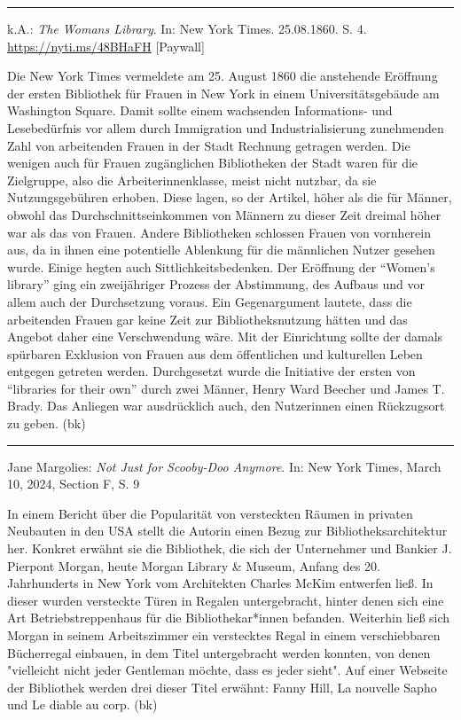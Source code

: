 \documentclass[a4paper,
fontsize=11pt,
oneside,
numbers=noperiodatend,
parskip=half-,
bibliography=totoc,
final
]{scrartcl}
\begin{document}
\begin{center}\rule{0.5\linewidth}{0.5pt}\end{center}

k.A.: \emph{The Woman\textquotesingle s Library}. In: New York Times.
25.08.1860. S. 4. \url{https://nyti.ms/48BHaFH} {[}Paywall{]}

Die New York Times vermeldete am 25. August 1860 die anstehende
Eröffnung der ersten Bibliothek für Frauen in New York in einem
Universitätsgebäude am Washington Square. Damit sollte einem wachsenden
Informations- und Lesebedürfnis vor allem durch Immigration und
Industrialisierung zunehmenden Zahl von arbeitenden Frauen in der Stadt
Rechnung getragen werden. Die wenigen auch für Frauen zugänglichen
Bibliotheken der Stadt waren für die Zielgruppe, also die
Arbeiterinnenklasse, meist nicht nutzbar, da sie Nutzungsgebühren
erhoben. Diese lagen, so der Artikel, höher als die für Männer, obwohl
das Durchschnittseinkommen von Männern zu dieser Zeit dreimal höher war
als das von Frauen. Andere Bibliotheken schlossen Frauen von vornherein
aus, da in ihnen eine potentielle Ablenkung für die männlichen Nutzer
gesehen wurde. Einige hegten auch Sittlichkeitsbedenken. Der Eröffnung
der \enquote{Women's library} ging ein zweijähriger Prozess der
Abstimmung, des Aufbaus und vor allem auch der Durchsetzung voraus. Ein
Gegenargument lautete, dass die arbeitenden Frauen gar keine Zeit zur
Bibliotheksnutzung hätten und das Angebot daher eine Verschwendung wäre.
Mit der Einrichtung sollte der damals spürbaren Exklusion von Frauen aus
dem öffentlichen und kulturellen Leben entgegen getreten werden.
Durchgesetzt wurde die Initiative der ersten von \enquote{libraries for
their own} durch zwei Männer, Henry Ward Beecher und James T. Brady. Das
Anliegen war ausdrücklich auch, den Nutzerinnen einen Rückzugsort zu
geben. (bk)

\begin{center}\rule{0.5\linewidth}{0.5pt}\end{center}

Jane Margolies: \emph{Not Just for Scooby-Doo Anymore}. In: New York
Times, March 10, 2024, Section F, S. 9

In einem Bericht über die Popularität von versteckten Räumen in privaten
Neubauten in den USA stellt die Autorin einen Bezug zur
Bibliotheksarchitektur her. Konkret erwähnt sie die Bibliothek, die sich
der Unternehmer und Bankier J. Pierpont Morgan, heute Morgan Library \&
Museum, Anfang des 20. Jahrhunderts in New York vom Architekten Charles
McKim entwerfen ließ. In dieser wurden versteckte Türen in Regalen
untergebracht, hinter denen sich eine Art Betriebstreppenhaus für die
Bibliothekar*innen befanden. Weiterhin ließ sich Morgan in seinem
Arbeitszimmer ein verstecktes Regal in einem verschiebbaren Bücherregal
einbauen, in dem Titel untergebracht werden konnten, von denen
"vielleicht nicht jeder Gentleman möchte, dass es jeder sieht". Auf
einer Webseite der Bibliothek werden drei dieser Titel erwähnt: Fanny
Hill, La nouvelle Sapho und Le diable au corp. (bk)
\end{document}
